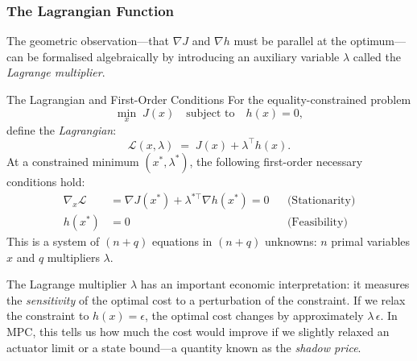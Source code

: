 \subsubsection{The Lagrangian Function}

The geometric observation---that $\nabla J$ and $\nabla h$ must be parallel at the optimum---can be formalised algebraically by introducing an auxiliary variable $\lambda$ called the \emph{Lagrange multiplier}.

\begin{defnbox}{The Lagrangian and First-Order Conditions}
	For the equality-constrained problem
	\[
	\min_{x}\; J(x) \quad \text{subject to} \quad h(x) = 0,
	\]
	define the \emph{Lagrangian}:
	\[
	\mathcal{L}(x,\lambda) \;=\; J(x) + \lambda^\top h(x).
	\]
	At a constrained minimum $(x^*,\lambda^*)$, the following first-order necessary conditions hold:
	\begin{align*}
		\nabla_x \mathcal{L} &= \nabla J(x^*) + \lambda^{*\top} \nabla h(x^*) = 0 && \text{(Stationarity)}\\
		h(x^*) &= 0 && \text{(Feasibility)}
	\end{align*}
	This is a system of $(n+q)$ equations in $(n+q)$ unknowns: $n$ primal variables $x$ and $q$ multipliers $\lambda$.
\end{defnbox}

The Lagrange multiplier $\lambda$ has an important economic interpretation: it measures the \emph{sensitivity} of the optimal cost to a perturbation of the constraint. If we relax the constraint to $h(x) = \epsilon$, the optimal cost changes by approximately $\lambda\,\epsilon$. In MPC, this tells us how much the cost would improve if we slightly relaxed an actuator limit or a state bound---a quantity known as the \emph{shadow price}.

